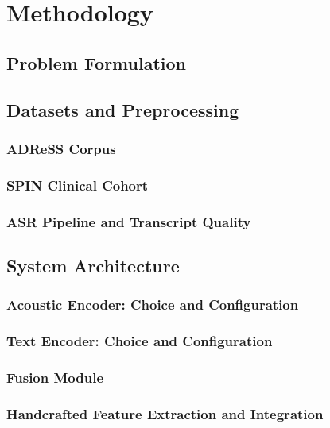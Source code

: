 \documentclass[a4paper,12pt]{article}
\begin{document}
\clearpage
\section{Methodology}

\subsection{Problem Formulation}

\subsection{Datasets and Preprocessing}

\subsubsection{ADReSS Corpus}

\subsubsection{SPIN Clinical Cohort}

\subsubsection{ASR Pipeline and Transcript Quality}

\subsection{System Architecture}

\subsubsection{Acoustic Encoder: Choice and Configuration}

\subsubsection{Text Encoder: Choice and Configuration}

\subsubsection{Fusion Module}

\subsubsection{Handcrafted Feature Extraction and Integration}
\end{document}
